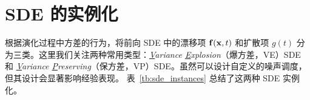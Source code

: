 


\newpage

\section{SDE 的实例化}\label{sec:instances}

\citet{song2020score} 根据演化过程中方差的行为，将前向 SDE 中的漂移项 ${\mathbf{f}}({\mathbf{x}}, t)$ 和扩散项 $g(t)$ 分为三类。这里我们关注两种常用类型：\emph{\underline{V}ariance \underline{E}xplosion}（爆方差，VE）SDE 和 \emph{\underline{V}ariance \underline{P}reserving}（保方差，VP）SDE。虽然可以设计自定义的噪声调度，但其设计会显著影响经验表现。
表~\ref{tb:sde_instances} 总结了这两种 SDE 实例化。
\begin{table}[th]
  \caption{前向 SDE 总结}
  \small
  \centering
  \label{tb:sde_instances}
\end{table}




